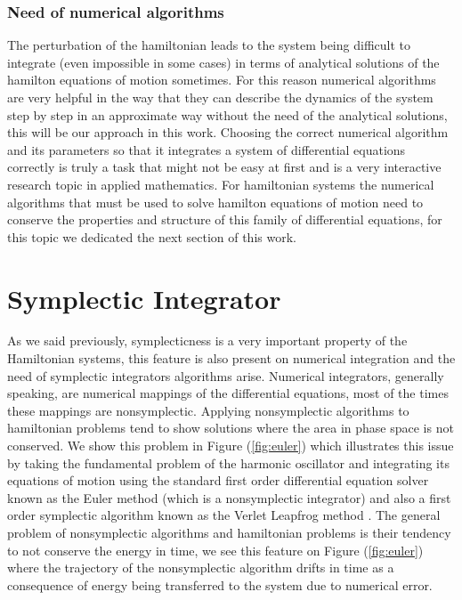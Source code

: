 \subsubsection{Need of numerical algorithms}

The perturbation of the hamiltonian leads to the system being difficult to integrate (even impossible in some cases) in terms of analytical solutions of the hamilton equations of motion sometimes. For this reason numerical algorithms are very helpful in the way that they can describe the dynamics of the system step by step in an approximate way without the need of the analytical solutions, this will be our approach in this work. Choosing the correct numerical algorithm and its parameters so that it integrates a system of differential equations correctly is truly a task that might not be easy at first and is a very interactive research topic in applied mathematics. For hamiltonian systems the numerical algorithms that must be used to solve hamilton equations of motion need to conserve the properties and structure of this family of differential equations, for this topic we dedicated the next section of this work.



\section{Symplectic Integrator}
As we said previously, symplecticness is a very important property of the Hamiltonian systems, this feature is also present on numerical integration and the need of symplectic integrators algorithms arise. Numerical integrators, generally speaking, are  numerical mappings of the differential equations, most of the times these mappings are nonsymplectic. Applying nonsymplectic algorithms to hamiltonian problems tend to show solutions where the area in phase space is not conserved. We show this problem in Figure (\ref{fig:euler}) which illustrates this issue by taking the fundamental problem of the harmonic oscillator and integrating its equations of motion using the standard first order differential equation solver known as the Euler method (which is a nonsymplectic integrator) and also a first order symplectic algorithm known as the Verlet Leapfrog method\cite{verlet1967computer}  \cite{forest1990fourth}. The general problem of nonsymplectic algorithms and hamiltonian problems is their tendency to not conserve the energy in time, we see this feature on Figure (\ref{fig:euler}) where the trajectory of the nonsymplectic algorithm drifts in time as a consequence of energy being transferred to the system due to numerical error.



